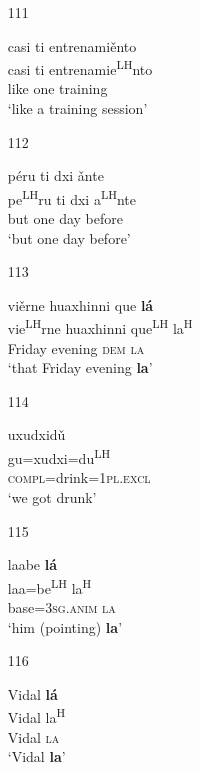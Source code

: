 \begin{itemize}
\item[111]
 
\glll   casi ti entrenami\v{e}nto\\
  casi ti entrenamie\textsuperscript{LH}nto\\
  like one training\\
\glt `like a training session'
 

\item[112]

\glll p\'{e}ru ti dxi \v{a}nte \\
pe\textsuperscript{LH}ru ti dxi a\textsuperscript{LH}nte \\
but one day before \\
\glt  `but one day before'



\item[113]

\glll vi\v{e}rne huaxhinni que \textbf{l\'{a}} \\
vie\textsuperscript{LH}rne huaxhinni que\textsuperscript{LH} la\textsuperscript{H} \\
Friday evening \textsc{dem} \textsc{la} \\
\glt  `that Friday evening \textbf{la}'



\item[114]

\glll uxudxid\v{u} \\
gu=xudxi=du\textsuperscript{LH} \\
\textsc{compl}=drink=1\textsc{pl.excl} \\
\glt  `we got drunk'



\item[115]

\glll laabe \textbf{l\'{a}} \\
laa=be\textsuperscript{LH} la\textsuperscript{H} \\
base=3\textsc{sg.anim} \textsc{la} \\
\glt  `him (pointing) \textbf{la}'



\item[116]

\glll Vidal \textbf{l\'{a}} \\
Vidal la\textsuperscript{H} \\
Vidal \textsc{la} \\
\glt  `Vidal \textbf{la}'




\end{itemize}
